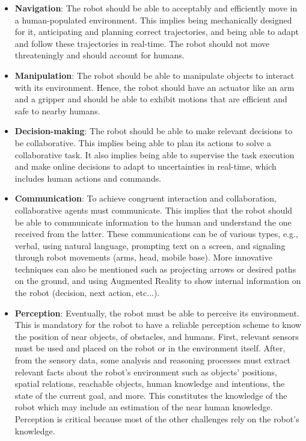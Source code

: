 \begin{itemize}
    \item \textbf{Navigation}: The robot should be able to acceptably and efficiently move in a human-populated environment. This implies being mechanically designed for it, anticipating and planning correct trajectories, and being able to adapt and follow these trajectories in real-time. The robot should not move threateningly and should account for humans.

    \item \textbf{Manipulation}: The robot should be able to manipulate objects to interact with its environment. Hence, the robot should have an actuator like an arm and a gripper and should be able to exhibit motions that are efficient and safe to nearby humans.

    \item \textbf{Decision-making}: The robot should be able to make relevant decisions to be collaborative. This implies being able to plan its actions to solve a collaborative task. It also implies being able to supervise the task execution and make online decisions to adapt to uncertainties in real-time, which includes human actions and commands. 

    \item \textbf{Communication}: To achieve congruent interaction and collaboration, collaborative agents must communicate. This implies that the robot should be able to communicate information to the human and understand the one received from the latter. These communications can be of various types, e.g., verbal, using natural language, prompting text on a screen, and signaling through robot movements (arms, head, mobile base). More innovative techniques can also be mentioned such as projecting arrows or desired paths on the ground, and using Augmented Reality to show internal information on the robot (decision, next action, etc...).

    \item \textbf{Perception}: Eventually, the robot must be able to perceive its environment. This is mandatory for the robot to have a reliable perception scheme to know the position of near objects, of obstacles, and humans. First, relevant sensors must be used and placed on the robot or in the environment itself. After, from the sensory data, some analysis and reasoning processes must extract relevant facts about the robot's environment such as objects' positions, spatial relations, reachable objects, human knowledge and intentions, the state of the current goal, and more. This constitutes the knowledge of the robot which may include an estimation of the near human knowledge. Perception is critical because most of the other challenges rely on the robot's knowledge.

\end{itemize}
    

